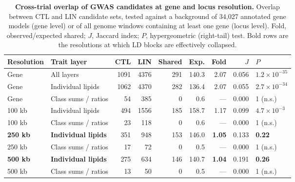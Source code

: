 \documentclass[9pt,twocolumn,twoside]{rilabRxiv}
\begin{document}
\begin{table}[!ht]
\centering
\caption{\textbf{Cross-trial overlap of GWAS candidates at gene and locus resolution.} Overlap between CTL and LIN candidate sets, tested against a background of 34{,}027 annotated gene models (gene level) or of all genome windows containing at least one gene (locus level). Fold, observed/expected shared; $J$, Jaccard index; $P$, hypergeometric (right-tail) test. Bold rows are the resolutions at which LD blocks are effectively collapsed.}
\label{tab:overlap}
\scriptsize
\begin{tabular}{llrrrrrrl}
\toprule
\textbf{Resolution} & \textbf{Trait layer} & \textbf{CTL} & \textbf{LIN} & \textbf{Shared} & \textbf{Exp.} & \textbf{Fold} & \textbf{$J$} & \textbf{$P$} \\
\midrule
Gene   & All layers          & 1091 & 4376 & 291 & 140.3 & 2.07 & 0.056 & $1.2\times10^{-35}$ \\
Gene   & Individual lipids   & 1062 & 4370 & 282 & 136.4 & 2.07 & 0.055 & $2.7\times10^{-34}$ \\
Gene   & Class sums / ratios &   54 &  385 &   0 &   0.6 & --- & 0.000 & 1 (n.s.) \\
\midrule
100 kb & Individual lipids   &  494 & 1556 & 185 & 158.7 & 1.17 & 0.099 & $4.7\times10^{-3}$ \\
100 kb & Class sums / ratios &   23 &  118 &   0 &   0.6 & --- & 0.000 & 1 (n.s.) \\
\textbf{250 kb} & \textbf{Individual lipids} & 351 & 948 & 153 & 146.0 & \textbf{1.05} & 0.133 & \textbf{0.22} \\
250 kb & Class sums / ratios &   17 &   72 &   0 &   0.5 & --- & 0.000 & 1 (n.s.) \\
\textbf{500 kb} & \textbf{Individual lipids} & 275 & 634 & 146 & 140.7 & \textbf{1.04} & 0.191 & \textbf{0.26} \\
500 kb & Class sums / ratios &   13 &   50 &   0 &   0.5 & --- & 0.000 & 1 (n.s.) \\
\bottomrule
\end{tabular}
\end{table}
\end{document}
